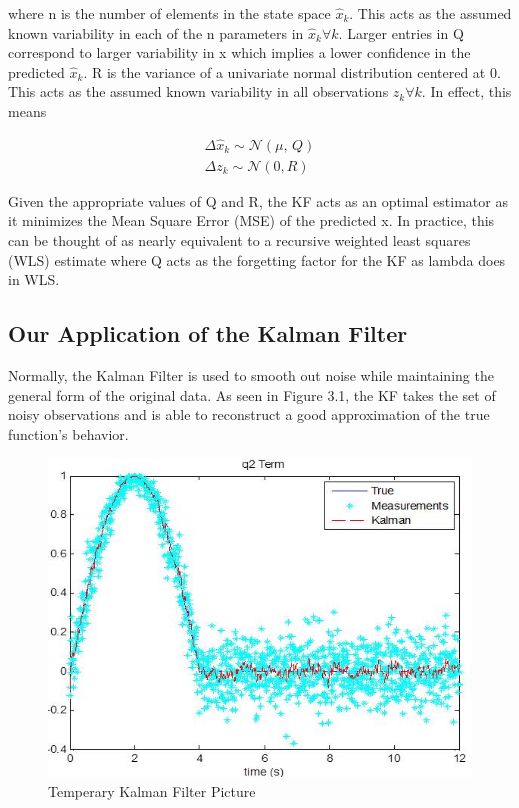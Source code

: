  where n is the number of elements in the state space $\hat{x}_{k}$. This acts as the assumed known variability in each of the n parameters in $\hat{x}_{k} \forall k$. Larger entries in Q correspond to larger variability in x which implies a lower confidence in the predicted $\hat{x}_{k}$. R is the variance of a univariate normal distribution centered at 0. This acts as the assumed known variability in all observations $z_{k} \forall k$. In effect, this means
 
\begin{subequations}
\begin{align}
    \Delta \hat{x}_{k} \sim \mathcal{N}(\mu,\,Q) \\
    \Delta z_{k} \sim \mathcal{N}(0,R) 
\end{align}
\end{subequations}

Given the appropriate values of Q and R, the KF acts as an optimal estimator as it minimizes the Mean Square Error (MSE) of the predicted x. In practice, this can be thought of as nearly equivalent to a recursive weighted least squares (WLS) estimate where Q acts as the forgetting factor for the KF as lambda does in WLS. 

\subsection{Our Application of the Kalman Filter}
Normally, the Kalman Filter is used to smooth out noise while maintaining the general form of the original data. As seen in Figure 3.1, the KF takes the set of noisy observations and is able to reconstruct a good approximation of the true function's behavior.

\begin{figure}[h]
\centering
\includegraphics{body/methodology/q2_kalman.jpg}
\caption{Temperary Kalman Filter Picture}
\end{figure}

